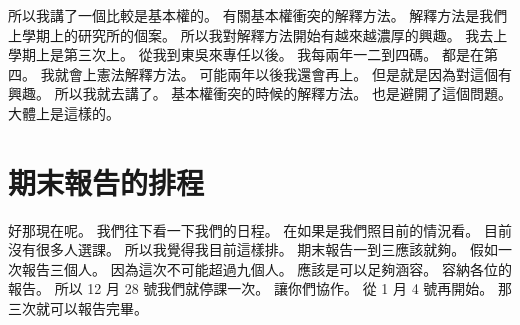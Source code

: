 \hypertarget{w01:cue:1443}{}所以我講了一個比較是基本權的。
\hypertarget{w01:cue:1444}{}有關基本權衝突的解釋方法。
\hypertarget{w01:cue:1445}{}解釋方法是我們上學期上的研究所的個案。
\hypertarget{w01:cue:1446}{}所以我對解釋方法開始有越來越濃厚的興趣。
\hypertarget{w01:cue:1447}{}我去上學期上是第三次上。
\hypertarget{w01:cue:1448}{}從我到東吳來專任以後。
\hypertarget{w01:cue:1449}{}我每兩年一二到四碼。
\hypertarget{w01:cue:1450}{}都是在第四。
\hypertarget{w01:cue:1451}{}我就會上憲法解釋方法。
\hypertarget{w01:cue:1452}{}可能兩年以後我還會再上。
\hypertarget{w01:cue:1453}{}但是就是因為對這個有興趣。
\hypertarget{w01:cue:1454}{}所以我就去講了。
\hypertarget{w01:cue:1455}{}基本權衝突的時候的解釋方法。
\hypertarget{w01:cue:1456}{}也是避開了這個問題。
\hypertarget{w01:cue:1457}{}大體上是這樣的。

\section{期末報告的排程}

\hypertarget{w01:cue:1458}{}好那現在呢。
\hypertarget{w01:cue:1459}{}我們往下看一下我們的日程。
\hypertarget{w01:cue:1460}{}在如果是我們照目前的情況看。
\hypertarget{w01:cue:1461}{}目前沒有很多人選課。
\hypertarget{w01:cue:1462}{}所以我覺得我目前這樣排。
\hypertarget{w01:cue:1463}{}期末報告一到三應該就夠。
\hypertarget{w01:cue:1464}{}假如一次報告三個人。
\hypertarget{w01:cue:1465}{}因為這次不可能超過九個人。
\hypertarget{w01:cue:1466}{}應該是可以足夠涵容。
\hypertarget{w01:cue:1467}{}容納各位的報告。
\hypertarget{w01:cue:1468}{}所以 12 月 28 號我們就停課一次。
\hypertarget{w01:cue:1469}{}讓你們協作。
\hypertarget{w01:cue:1470}{}從 1 月 4 號再開始。
\hypertarget{w01:cue:1471}{}那三次就可以報告完畢。


